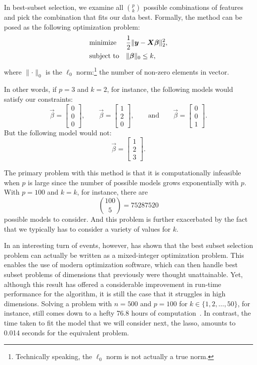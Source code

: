 In best-subset selection, we examine all \(\binom{p}{k}\) possible combinations of features and pick the combination that fits our data best. Formally, the method can be posed as the following optimization problem:
\[
  \begin{aligned}
     & \text{minimize}   &  & \frac{1}{2} \lVert \boldsymbol{y} - \boldsymbol{X}\boldsymbol{\beta}\rVert^2_2, \\
     & \text{subject to} &  & \lVert \boldsymbol{\beta} \rVert_0 \leq k,
  \end{aligned}
\]
where \(\lVert \cdot \rVert_0\) is the \(\ell_0\) norm:\footnote{Technically speaking, the \(\ell_0\) norm is not actually a true norm.} the number of non-zero elements in vector.

In other words, if \(p = 3\) and \(k = 2\), for instance, the following models would satisfy our constraints:
\[
  \vec{\beta} = \begin{bmatrix}0 \\ 0 \\ 0\end{bmatrix},\qquad \vec{\beta} = \begin{bmatrix}1 \\ 2 \\ 0\end{bmatrix},\qquad \text{and} \qquad \vec{\beta} = \begin{bmatrix}0 \\ 0 \\ 1\end{bmatrix}.
\]
But the following model would not:
\[
  \vec{\beta} = \begin{bmatrix}1 \\ 2 \\ 3\end{bmatrix}.
\]

The primary problem with this method is that it is computationally infeasible when \(p\) is large since the number of possible models grows exponentially with \(p\). With \(p = 100\) and \(k = k\), for instance, there are
\[
  \binom{100}{5} = \num{75287520}
\]
possible models to consider. And this problem is further exacerbated by the fact that we typically has to consider a variety of values for \(k\).

In an interesting turn of events, however, \textcite{bertsimas2016} has shown that the best subset selection problem can actually be written as a mixed-integer optimization problem. This enables the use of modern optimization software, which can then handle best subset problems of dimensions that previously were thought unattainable. Yet, although this result has offered a considerable improvement in run-time performance for the algorithm, it is still the case that it struggles in high dimensions. Solving a problem with \(n=500\) and \(p=100\) for \(k \in \{1,2,\dots,50\}\), for instance, still comes down to a hefty 76.8 hours of computation~\parencite{hastie2020}. In contrast, the time taken to fit the model that we will consider next, the lasso, amounts to 0.014 seconds for the equivalent problem.

